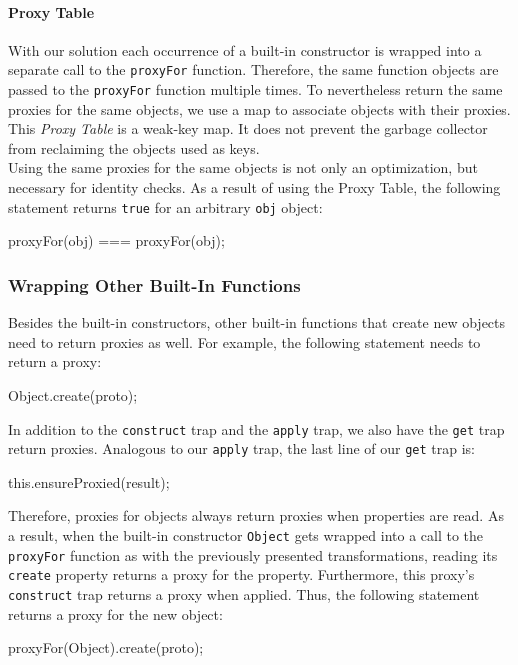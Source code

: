 \paragraph{Proxy Table}
With our solution each occurrence of a built-in constructor is wrapped into a separate call to the \lstinline{proxyFor} function.
Therefore, the same function objects are passed to the \lstinline{proxyFor} function multiple times.
To nevertheless return the same proxies for the same objects, we use a map to associate objects with their proxies.
This \emph{Proxy Table} is a weak-key map.
It does not prevent the garbage collector from reclaiming the objects used as keys.\\
Using the same proxies for the same objects is not only an optimization, but necessary for identity checks.
As a result of using the Proxy Table, the following statement returns \lstinline{true} for an arbitrary \lstinline{obj} object:

\begin{code}{}{}
proxyFor(obj) === proxyFor(obj);
\end{code}
\iffalse
\end{verbatim}\fi



\subsubsection{Wrapping Other Built-In Functions}

Besides the built-in constructors, other built-in functions that create new objects need to return proxies as well.
For example, the following statement needs to return a proxy:

\begin{code}{}{}
Object.create(proto);
\end{code}
\iffalse
\end{verbatim}\fi

In addition to the \lstinline{construct} trap and the \lstinline{apply} trap, we also have the \lstinline{get} trap return proxies.
Analogous to our \lstinline{apply} trap, the last line of our \lstinline{get} trap is:

\begin{code}{}{}
this.ensureProxied(result);
\end{code}
\iffalse
\end{verbatim}\fi

Therefore, proxies for objects always return proxies when properties are read.
As a result, when the built-in constructor \lstinline{Object} gets wrapped into a call to the \lstinline{proxyFor} function as with the previously presented transformations, reading its \lstinline{create} property returns a proxy for the property.
Furthermore, this proxy's \lstinline{construct} trap returns a proxy when applied.
Thus, the following statement returns a proxy for the new object:

\begin{code}{}{}
proxyFor(Object).create(proto);
\end{code}
\iffalse
\end{verbatim}\fi

